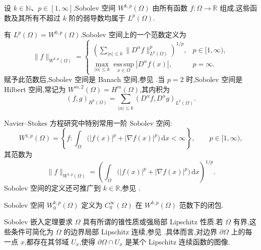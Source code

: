 \begin{definition}\label{def:appendix-a-30}
设 $k\in\mathbb N$、$p\in[1,\infty]$.Sobolev 空间 $W^{k,p}(\Omega)$ 由所有函数 $f:\Omega\to\mathbb R$ 组成,这些函数及其所有不超过 $k$ 阶的弱导数均属于 $L^p(\Omega)$.
\end{definition}

\begin{note}[Sobolev 空间]\label{note:appendix-a-31}
有 $L^p(\Omega)=W^{0,p}(\Omega)$.Sobolev 空间上的一个范数定义为
\[
 \|f\|_{W^{k,p}(\Omega)}=
 \begin{cases}
 \displaystyle\left(\sum_{|\alpha|\le k}\|D^\alpha f\|_{L^p(\Omega)}^p\right)^{1/p},&p\in[1,\infty),\\[1ex]
 \displaystyle\max_{|\alpha|\le k}\operatorname*{ess\,sup}_{x\in\Omega}|D^\alpha f(x)|,&p=\infty.
 \end{cases}
\]
赋予此范数后,Sobolev 空间是 Banach 空间,参见 \textcite[第 262 页]{Evans2010}.当 $p=2$ 时,Sobolev 空间是 Hilbert 空间,常记为 $W^{m,2}(\Omega)=H^m(\Omega)$,其内积为
\[
 (f,g)_{H^k(\Omega)}=\sum_{|\alpha|\le k}(D^\alpha f,D^\alpha g)_{L^2(\Omega)}.
\]

Navier--Stokes 方程研究中特别常用一阶 Sobolev 空间:
\[
 W^{1,p}(\Omega)=\left\{f:\int_\Omega\bigl(|f(x)|^p+|\nabla f(x)|^p\bigr)\,\mathrm dx<\infty\right\},
 \qquad p\in[1,\infty),
\]
其范数为
\[
 \|f\|_{W^{1,p}(\Omega)}=
 \left(\int_\Omega\bigl(|f(x)|^p+|\nabla f(x)|^p\bigr)\,\mathrm dx\right)^{1/p}.
\]
Sobolev 空间的定义还可推广到 $k\in\mathbb R$,参见 \textcite{Adams1975}.
\end{note}

\begin{definition}\label{def:appendix-a-32}
Sobolev 空间 $W_0^{k,p}(\Omega)$ 定义为 $C_0^\infty(\Omega)$ 在 $W^{k,p}(\Omega)$ 范数下的闭包.
\end{definition}

\begin{note}[区域边界的光滑性]\label{note:appendix-a-33}
Sobolev 嵌入定理要求 $\Omega$ 具有所谓的锥性质或强局部 Lipschitz 性质.若 $\Omega$ 有界,这些条件可简化为 $\Omega$ 的边界局部 Lipschitz 连续,参见 \textcite[第 67 页]{Adams1975}.具体而言,对边界 $\partial\Omega$ 上的每一点 $x$,都存在其邻域 $U_x$,使得 $\partial\Omega\cap U_x$ 是某个 Lipschitz 连续函数的图像.
\end{note}

